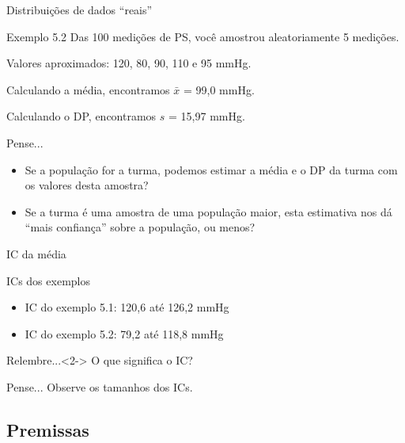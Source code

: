 \documentclass{beamer}
\begin{document}

\begin{frame}{\scriptsize Distribuições de dados ``reais''}
  \begin{exampleblock}{Exemplo 5.2}
    \scriptsize
    Das 100 medições de PS, você amostrou aleatoriamente 5 medições.

    Valores aproximados: 120, 80, 90, 110 e 95 mmHg.

    \bigskip
    Calculando a média, encontramos $\bar{x}$ = 99,0 mmHg.

    Calculando o DP, encontramos $s$ = 15,97 mmHg.
  \end{exampleblock}
  \begin{block}{Pense...}
    \footnotesize
    \begin{itemize}
      \scriptsize
    \item Se a população for a turma, podemos estimar a média e o DP da turma com os valores desta amostra?
    \item Se a turma é uma amostra de uma população maior, esta estimativa nos dá ``mais confiança'' sobre a população, ou menos?
    \end{itemize}
  \end{block}
\end{frame}

\begin{frame}{\scriptsize IC da média}
  \begin{exampleblock}{ICs dos exemplos}
    \footnotesize
    \begin{itemize}
      \footnotesize
    \item IC do exemplo 5.1: 120,6 até 126,2 mmHg
        \medskip
    \item IC do exemplo 5.2: 79,2 até 118,8 mmHg
    \end{itemize}
  \end{exampleblock}
  \begin{block}{Relembre...}<2->
    \footnotesize
    O que significa o IC?
  \end{block}
  \begin{block}{Pense...}
    \footnotesize
    Observe os tamanhos dos ICs.
  \end{block}
\end{frame}

\subsection{Premissas}
\end{document}
